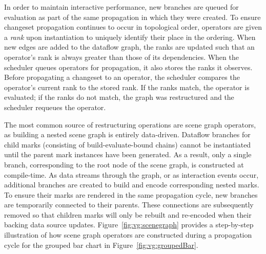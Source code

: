 In order to maintain interactive performance, new branches are queued for
evaluation as part of the same propagation in which they were created. To
ensure changeset propagation continues to occur in topological order,
operators are given a \emph{rank} upon instantiation to uniquely identify
their place in the ordering. When new edges are added to the dataflow graph,
the ranks are updated such that an operator's rank is always greater than
those of its dependencies. When the scheduler queues operators for
propagation, it also stores the ranks it observes. Before propagating a
changeset to an operator, the scheduler compares the operator's current rank
to the stored rank. If the ranks match, the operator is evaluated; if the
ranks do not match, the graph was restructured and the scheduler requeues the
operator.

The most common source of restructuring operations are scene graph operators, as
building a nested scene graph is entirely data-driven. Dataflow branches for
child marks (consisting of build-evaluate-bound chains) cannot be instantiated
until the parent mark instances have been generated. As a result, only a single
branch, corresponding to the root node of the scene graph, is constructed at
compile-time. As data streams through the graph, or as interaction events occur,
additional branches are created to build and encode corresponding nested marks.
To ensure their marks are rendered in the same propagation cycle, new branches
are temporarily connected to their parents. These connections are subsequently
removed so that children marks will only be rebuilt and re-encoded when their
backing data source updates. Figure~\ref{fig:vg:scenegraph} provides a
step-by-step illustration of how scene graph operators are constructed during a
propagation cycle for the grouped bar chart in Figure~\ref{fig:vg:groupedBar}.